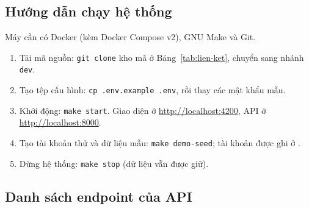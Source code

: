 \subsection{Hướng dẫn chạy hệ thống}

Máy cần có Docker (kèm Docker Compose v2), GNU Make và Git.

\begin{enumerate}
    \item Tải mã nguồn: \texttt{git clone} kho mã ở Bảng~\ref{tab:lien-ket}, chuyển sang nhánh
    \texttt{dev}.
    \item Tạo tệp cấu hình: \texttt{cp .env.example .env}, rồi thay các mật khẩu mẫu.
    \item Khởi động: \texttt{make start}. Giao diện ở \url{http://localhost:4200}, API ở
    \url{http://localhost:8000}.
    \item Tạo tài khoản thử và dữ liệu mẫu: \texttt{make demo-seed}; tài khoản được ghi ở
    .
    \item Dừng hệ thống: \texttt{make stop} (dữ liệu vẫn được giữ).
\end{enumerate}

\subsection{Danh sách endpoint của API}

